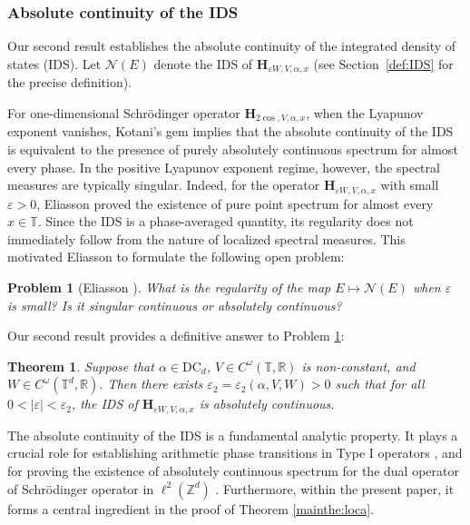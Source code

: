 \documentclass[reqno,11pt]{amsart}
\newtheorem{theorem}{Theorem}[section]
\newtheorem{problem}{Problem}
\newcommand{\Z}{{\mathbb Z}}
\newcommand{\R}{{\mathbb R}}
\newcommand{\T}{{\mathbb T}}
\begin{document}
\subsubsection{Absolute continuity of the IDS}

Our second result establishes the absolute continuity of the integrated density of states (IDS).   Let $\mathcal{N}(E)$ denote the IDS of $\mathbf{H}_{\varepsilon W,V,\alpha,x}$  (see Section~\ref{def:IDS} for the precise definition).

For one-dimensional Schr\"odinger operator $\mathbf{H}_{2\cos,V,\alpha,x}$, 
when the Lyapunov exponent vanishes, Kotani's gem \cite{kotani2} implies that the absolute continuity of the IDS is equivalent to the presence of purely absolutely continuous spectrum for almost every phase. In the positive Lyapunov exponent regime, however, the spectral measures are typically singular. Indeed, for the operator $\mathbf{H}_{\varepsilon W,V,\alpha,x}$ with small $\varepsilon>0$, Eliasson \cite{Eli97, E} proved the existence of pure point spectrum for almost every $x\in\T$. Since the IDS is a phase-averaged quantity, its regularity does not immediately follow from the nature of localized spectral measures. This motivated Eliasson \cite{E} to formulate the following open problem:

\begin{problem}[Eliasson \cite{E}]\label{prob:eliasson}
What is the regularity of the map $E\mapsto \mathcal N(E)$ when $\varepsilon$ is small? Is it singular continuous or absolutely continuous?
\end{problem}

Our second result provides a definitive answer to Problem \ref{prob:eliasson}:

\begin{theorem}\label{thm:IDSac}
Suppose that $\alpha \in \mathrm{DC}_d$, $V\in C^{\omega}(\T,\R)$ is non-constant, and $W\in C^{\omega}(\T^d,\R)$.  Then there exists $\varepsilon_2=\varepsilon_2(\alpha,V,W)>0$ such that for all $0<|\varepsilon|<\varepsilon_2$, the IDS of $\mathbf{H}_{\varepsilon W,V,\alpha,x}$ is absolutely continuous.
\end{theorem}

The absolute continuity of the IDS is a fundamental analytic property. It plays a crucial role for establishing arithmetic phase transitions in Type I operators \cite{GJ}, and for proving the existence of absolutely continuous spectrum for the dual operator of Schr\"odinger operator in $\ell^2(\Z^d)$ \cite{BJ2}. Furthermore, within the present paper, it forms a central ingredient in the proof of Theorem \ref{mainthe:loca}.
\end{document}
